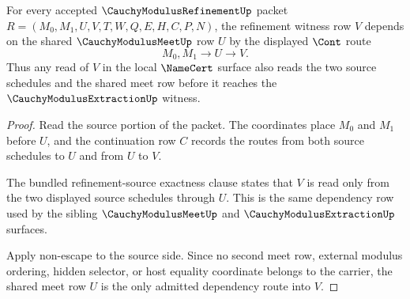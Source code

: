 \begin{theorem}
\label{thm:cauchy-modulus-refinement-shared-meet-dependency}
For every accepted $\CauchyModulusRefinementUp$ packet $R=(M_0,M_1,U,V,T,W,Q,E,H,C,P,N)$, the refinement witness row $V$ depends on the shared $\CauchyModulusMeetUp$ row $U$ by the displayed $\Cont$ route
$$
M_0,M_1 \longrightarrow U \longrightarrow V.
$$
Thus any read of $V$ in the local $\NameCert$ surface also reads the two source schedules and the shared meet row before it reaches the $\CauchyModulusExtractionUp$ witness.
\end{theorem}
\begin{proof}
Read the source portion of the packet. The coordinates place $M_0$ and $M_1$ before $U$, and the continuation row $C$ records the routes from both source schedules to $U$ and from $U$ to $V$.

The bundled refinement-source exactness clause states that $V$ is read only from the two displayed source schedules through $U$. This is the same dependency row used by the sibling $\CauchyModulusMeetUp$ and $\CauchyModulusExtractionUp$ surfaces.

Apply non-escape to the source side. Since no second meet row, external modulus ordering, hidden selector, or host equality coordinate belongs to the carrier, the shared meet row $U$ is the only admitted dependency route into $V$.
\end{proof}

